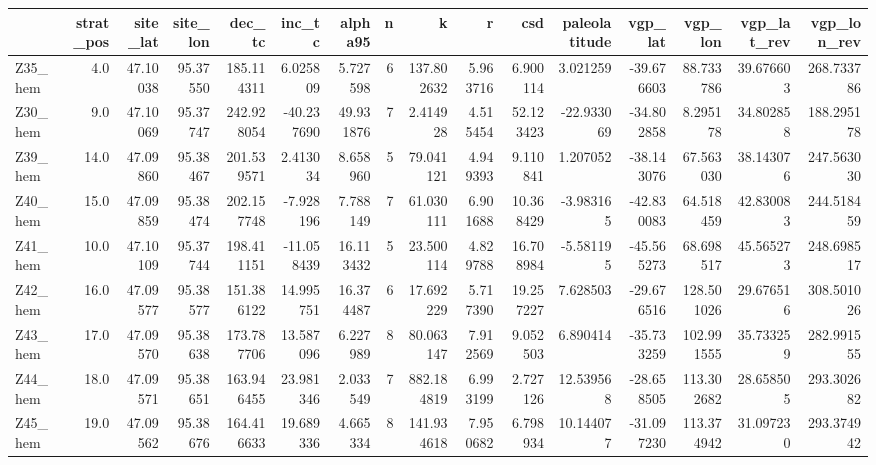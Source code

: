 \documentclass[11pt]{article}
\begin{document}
    \begin{sidewaystable}
    {\tiny\begin{tabular}{lrrrrrrrrrrrrrrr}
\toprule
{} &  strat\_pos &  site\_lat &  site\_lon &      dec\_tc &     inc\_tc &    alpha95 &  n &           k &         r &        csd &  paleolatitude &    vgp\_lat &     vgp\_lon &  vgp\_lat\_rev &  vgp\_lon\_rev \\
\midrule
Z35\_hem &        4.0 &  47.10038 &  95.37550 &  185.114311 &   6.025809 &   5.727598 &  6 &  137.802632 &  5.963716 &   6.900114 &       3.021259 & -39.676603 &   88.733786 &    39.676603 &   268.733786 \\
Z30\_hem &        9.0 &  47.10069 &  95.37747 &  242.928054 & -40.237690 &  49.931876 &  7 &    2.414928 &  4.515454 &  52.123423 &     -22.933069 & -34.802858 &    8.295178 &    34.802858 &   188.295178 \\
Z39\_hem &       14.0 &  47.09860 &  95.38467 &  201.539571 &   2.413034 &   8.658960 &  5 &   79.041121 &  4.949393 &   9.110841 &       1.207052 & -38.143076 &   67.563030 &    38.143076 &   247.563030 \\
Z40\_hem &       15.0 &  47.09859 &  95.38474 &  202.157748 &  -7.928196 &   7.788149 &  7 &   61.030111 &  6.901688 &  10.368429 &      -3.983165 & -42.830083 &   64.518459 &    42.830083 &   244.518459 \\
Z41\_hem &       10.0 &  47.10109 &  95.37744 &  198.411151 & -11.058439 &  16.113432 &  5 &   23.500114 &  4.829788 &  16.708984 &      -5.581195 & -45.565273 &   68.698517 &    45.565273 &   248.698517 \\
Z42\_hem &       16.0 &  47.09577 &  95.38577 &  151.386122 &  14.995751 &  16.374487 &  6 &   17.692229 &  5.717390 &  19.257227 &       7.628503 & -29.676516 &  128.501026 &    29.676516 &   308.501026 \\
Z43\_hem &       17.0 &  47.09570 &  95.38638 &  173.787706 &  13.587096 &   6.227989 &  8 &   80.063147 &  7.912569 &   9.052503 &       6.890414 & -35.733259 &  102.991555 &    35.733259 &   282.991555 \\
Z44\_hem &       18.0 &  47.09571 &  95.38651 &  163.946455 &  23.981346 &   2.033549 &  7 &  882.184819 &  6.993199 &   2.727126 &      12.539568 & -28.658505 &  113.302682 &    28.658505 &   293.302682 \\
Z45\_hem &       19.0 &  47.09562 &  95.38676 &  164.416633 &  19.689336 &   4.665334 &  8 &  141.934618 &  7.950682 &   6.798934 &      10.144077 & -31.097230 &  113.374942 &    31.097230 &   293.374942 \\

\end{tabular}}
\end{sidewaystable}
\end{document}
